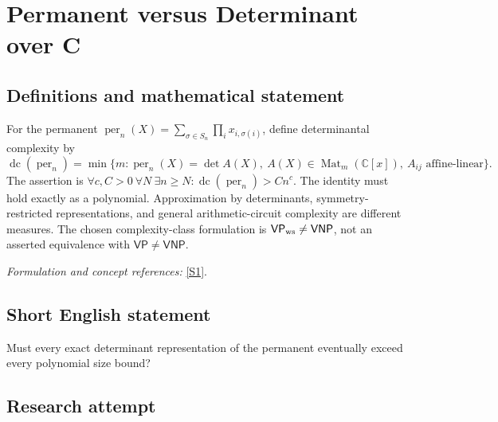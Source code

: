\documentclass[11pt,a4paper]{article}
\newcommand{\C}{\mathbb{C}}
\newcommand{\sref}[2]{\hyperlink{source:#1:#2}{[S#2]}}
\newif\ifshowcatalogue
\newcommand{\cataloguescope}[1]{\ifshowcatalogue
 \paragraph{Exact scope in the supplied catalogue.}
 \begin{quote}\small #1\end{quote}\fi}
\numberwithin{equation}{section}
\begin{document}
\setcounter{section}{0}
\clearpage
\section*{\texorpdfstring{Permanent versus Determinant over C}{Permanent versus Determinant over C}}\label{statement}
\subsection{Definitions and mathematical statement}
For the permanent $\operatorname{per}_n(X)=\sum_{\sigma\in S_n}\prod_i x_{i,\sigma(i)}$, define determinantal complexity by
\[
 \operatorname{dc}(\operatorname{per}_n)=\min\{m:\operatorname{per}_n(X)=\det A(X),\
 A(X)\in\operatorname{Mat}_m(\C[x]),\ A_{ij}\text{ affine-linear}\}.
\]
The assertion is $\forall c,C>0\ \forall N\ \exists n\ge N:\operatorname{dc}(\operatorname{per}_n)>Cn^c$. The identity must hold exactly as a polynomial. Approximation by determinants, symmetry-restricted representations, and general arithmetic-circuit complexity are different measures. The chosen complexity-class formulation is $\mathsf{VP}_{\rm ws}\ne\mathsf{VNP}$, not an asserted equivalence with $\mathsf{VP}\ne\mathsf{VNP}$.
\par\smallskip\textit{Formulation and concept references:} \sref{statement}{1}.
\cataloguescope{Over C, let dc(per\_n) be the least m for which the n\ensuremath{\times}n permanent per\_n(X) equals the determinant of an m\ensuremath{\times}m matrix whose entries are affine-linear forms in the n\textasciicircum{}2 variables X, as an exact polynomial identity. Assert that dc(per\_n) is not O(n\textasciicircum{}c) for any real constant c>0: explicitly, for every c>0, C>0 and integer N\ensuremath{\ge}1, some n\ensuremath{\ge}N satisfies dc(per\_n)>C*n\textasciicircum{}c. No restrictions of equivariance, sparsity or symmetry are imposed on the representing matrix. This is exact, not border, determinantal complexity over C; the selected assertion is the source’s VP\_ws != VNP formulation, not an assertion that it is equivalent to VP != VNP.}
\subsection{Short English statement}
Must every exact determinant representation of the permanent eventually exceed every polynomial size bound?
\subsection{Research attempt}
\end{document}
